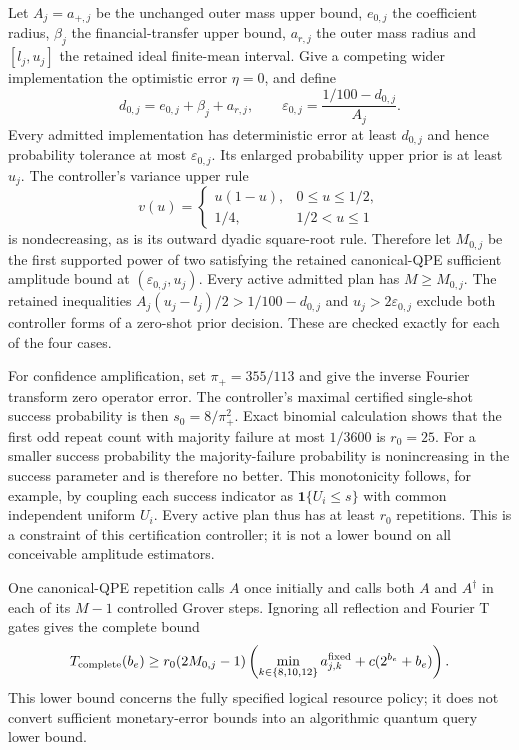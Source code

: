 \documentclass[11pt]{article}
\begin{document}
Let $A_j=a_{+,j}$ be the unchanged outer mass upper bound, $e_{0,j}$
the coefficient radius, $\beta_j$ the financial-transfer upper bound,
$a_{r,j}$ the outer mass radius and $[l_j,u_j]$ the retained ideal
finite-mean interval. Give a competing wider implementation the
optimistic error $\eta=0$, and define
\begin{equation}
 d_{0,j}=e_{0,j}+\beta_j+a_{r,j},\qquad
 \varepsilon_{0,j}=\frac{1/100-d_{0,j}}{A_j}.
\end{equation}
Every admitted implementation has deterministic error at least $d_{0,j}$
and hence probability tolerance at most $\varepsilon_{0,j}$. Its enlarged
probability upper prior is at least $u_j$. The controller's variance
upper rule
\begin{equation}
 v(u)=\begin{cases}u(1-u),&0\leq u\leq1/2,\\1/4,&1/2<u\leq1\end{cases}
\end{equation}
is nondecreasing, as is its outward dyadic square-root rule. Therefore
let $M_{0,j}$ be the first supported power of two satisfying the retained
canonical-QPE sufficient amplitude bound at $(\varepsilon_{0,j},u_j)$.
Every active admitted plan has $M\geq M_{0,j}$. The retained inequalities
$A_j(u_j-l_j)/2>1/100-d_{0,j}$ and $u_j>2\varepsilon_{0,j}$ exclude
both controller forms of a zero-shot prior decision. These are checked
exactly for each of the four cases.

For confidence amplification, set $\pi_+=355/113$ and give the inverse
Fourier transform zero operator error. The controller's maximal certified
single-shot success probability is then $s_0=8/\pi_+^2$. Exact binomial
calculation shows that the first odd repeat count with majority failure
at most $1/3600$ is $r_0=25$. For a smaller success probability the
majority-failure probability is nonincreasing in the success parameter
and is therefore no better. This monotonicity follows, for example, by
coupling each success indicator as $\mathbf1\{U_i\leq s\}$ with common
independent uniform $U_i$. Every active plan thus has at least $r_0$
repetitions. This is a constraint of this certification controller;
it is not a lower bound on all conceivable amplitude estimators.

One canonical-QPE repetition calls $A$ once initially and calls both
$A$ and $A^\dagger$ in each of its $M-1$ controlled Grover steps.
Ignoring all reflection and Fourier T gates gives the complete bound
\begin{equation}
 T_{\rm complete}(b_e)
 \geq r_0(2M_{0,j}-1)
       \left(\min_{k\in\{8,10,12\}}a^{\rm fixed}_{j,k}
             +c(2^{b_e}+b_e)\right).
\end{equation}
This lower bound concerns the fully specified logical resource policy;
it does not convert sufficient monetary-error bounds into an algorithmic
quantum query lower bound.
\end{document}
